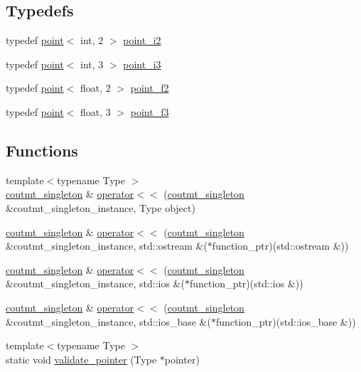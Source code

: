 \subsection*{Typedefs}
\begin{DoxyCompactItemize}
\item 
typedef \hyperlink{classxstd_1_1point}{point}$<$ int, 2 $>$ \hyperlink{namespacexstd_a05f630b2b093cec28fcdd96aca897f75}{point\-\_\-i2}
\item 
typedef \hyperlink{classxstd_1_1point}{point}$<$ int, 3 $>$ \hyperlink{namespacexstd_a28fb4f569d80e07173722c8cc3465f81}{point\-\_\-i3}
\item 
typedef \hyperlink{classxstd_1_1point}{point}$<$ float, 2 $>$ \hyperlink{namespacexstd_aa26f7d45c70ace7cd0722a5d5d89dcd8}{point\-\_\-f2}
\item 
typedef \hyperlink{classxstd_1_1point}{point}$<$ float, 3 $>$ \hyperlink{namespacexstd_ac9dcb9387fb1c6f4f82773a54bfa5843}{point\-\_\-f3}
\end{DoxyCompactItemize}
\subsection*{Functions}
\begin{DoxyCompactItemize}
\item 
{\footnotesize template$<$typename Type $>$ }\\\hyperlink{classxstd_1_1coutmt__singleton}{coutmt\-\_\-singleton} \& \hyperlink{namespacexstd_a1e84f1aca8ea660c6b6857dd74e23095}{operator$<$$<$} (\hyperlink{classxstd_1_1coutmt__singleton}{coutmt\-\_\-singleton} \&coutmt\-\_\-singleton\-\_\-instance, Type object)
\item 
\hyperlink{classxstd_1_1coutmt__singleton}{coutmt\-\_\-singleton} \& \hyperlink{namespacexstd_a4ca9ff5b467cc2d187627f25fe4becb9}{operator$<$$<$} (\hyperlink{classxstd_1_1coutmt__singleton}{coutmt\-\_\-singleton} \&coutmt\-\_\-singleton\-\_\-instance, std\-::ostream \&($\ast$function\-\_\-ptr)(std\-::ostream \&))
\item 
\hyperlink{classxstd_1_1coutmt__singleton}{coutmt\-\_\-singleton} \& \hyperlink{namespacexstd_ae5a5bddbedf675617d11176fea8fee8b}{operator$<$$<$} (\hyperlink{classxstd_1_1coutmt__singleton}{coutmt\-\_\-singleton} \&coutmt\-\_\-singleton\-\_\-instance, std\-::ios \&($\ast$function\-\_\-ptr)(std\-::ios \&))
\item 
\hyperlink{classxstd_1_1coutmt__singleton}{coutmt\-\_\-singleton} \& \hyperlink{namespacexstd_a05baea78d624e383708fa5f4ba944f8e}{operator$<$$<$} (\hyperlink{classxstd_1_1coutmt__singleton}{coutmt\-\_\-singleton} \&coutmt\-\_\-singleton\-\_\-instance, std\-::ios\-\_\-base \&($\ast$function\-\_\-ptr)(std\-::ios\-\_\-base \&))
\item 
{\footnotesize template$<$typename Type $>$ }\\static void \hyperlink{namespacexstd_a1394818244a2b5f81b3d248de17ec4c7}{validate\-\_\-pointer} (Type $\ast$pointer)
\end{DoxyCompactItemize}
